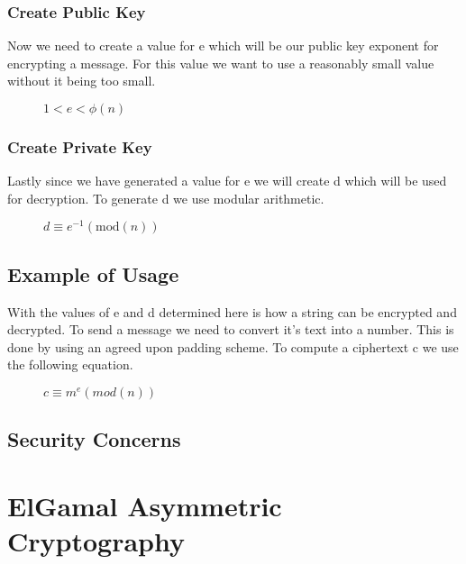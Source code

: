 \documentclass[conference]{IEEEtran}
\begin{document}
\subsubsection{Create Public Key}
Now we need to create a value for e which will be our public key exponent for encrypting a message. For this value we want to use a reasonably small value without it being too small. 
\begin{figure}[h]
	\begin{center}
		$1 < e < \phi \left(n\right)$
	\end{center}
\end{figure}
\subsubsection{Create Private Key}
Lastly since we have generated a value for e we will create d which will be used for decryption. To generate d we use modular arithmetic.

\begin{figure}[h]
	\begin{center}
		$d\equiv {e}^{-1}\left(\mathrm{mod}\left(n\right)\right)$
	\end{center}
\end{figure}

\subsection{Example of Usage}
With the values of e and d determined here is how a string can be encrypted and decrypted. To send a message we need to convert it's text into a number. This is done by using an agreed upon padding scheme. To compute a ciphertext c we use the following equation.

\begin{figure}[h]
	\begin{center}
		$c\equiv {m}^{e}\left(mod\left(n\right)\right)$
	\end{center}
\end{figure}




\subsection{Security Concerns}

\section{ElGamal Asymmetric Cryptography}
\end{document}
